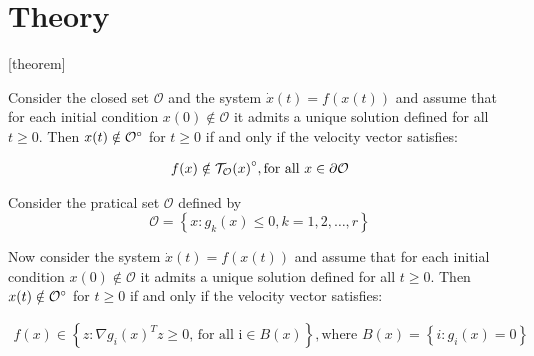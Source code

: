 % 

\section{Theory}
[theorem]

\begin{theorem}
Consider the closed set $\mathcal{O}$ and the system $\dot{x}(t) = f(x(t))$ and assume that for each initial
condition $x(0) \notin \mathcal{O}$ it admits a unique solution defined for all 
$t \geq 0$. Then $x(t) \notin {\mathcal{O}}^{\circ}$ for $t \geq 0$ if and 
only if the velocity vector satisfies:

\begin{align*}
    f(x) \notin {\mathcal{T}_{\mathcal{O}}(x)}^{\circ}, \text{for all } x \in \partial \mathcal{O}
\end{align*}
\end{theorem}

\begin{theorem}
Consider the pratical set $\mathcal{O}$ defined by
\begin{equation}
    \mathcal{O} = \left\{x : g_k(x) \leq 0, k = 1,2,\ldots,r \right\}
\end{equation}

Now consider the system $\dot{x}(t) = f(x(t))$ and assume that for each initial
condition $x(0) \notin \mathcal{O}$ it admits a unique solution defined for all 
$t \geq 0$. Then $x(t) \notin {\mathcal{O}}^{\circ}$ for $t \geq 0$ if and 
only if the velocity vector satisfies:

\begin{align*}
    f(x) \in \left\{z : \nabla g_{i}{(x)}^T z \geq 0 \text{, for all i} \in B(x)\right\} , \text{where } B(x) = \left\{i : g_i(x) = 0 \right\}
\end{align*}
\end{theorem}


